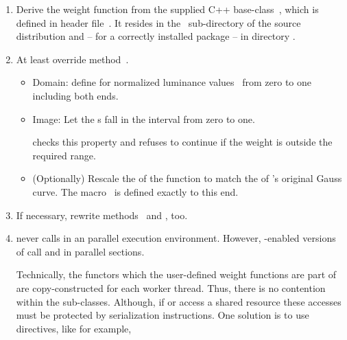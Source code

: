\begin{enumerate}
\item
  \begin{sloppypar}
    Derive the weight function from the supplied C++
    base-class~, which is defined in header
    file~.  It resides in the
    ~sub-directory of the source distribution and -- for
    a correctly installed package -- in directory
    .
  \end{sloppypar}

\item
  At least override method~.

  \begin{itemize}
  \item
    Domain: define  for normalized luminance
    values~ from zero to one including both ends.

  \item
    Image: Let the s fall in the interval from zero to
    one.

    \App{} checks this property and refuses to continue if the weight
    is outside the required range.

  \item
    (Optionally) Rescale the  of the function to match
    the  of \App{}'s original Gauss curve.  The
    macro~ is defined exactly to this end.
  \end{itemize}

\item
  If necessary, rewrite methods~ and
  , too.

\item
  \App{} never calls  in an  parallel
  execution environment.  However, -enabled versions
  of \App{} call  and  in parallel
  sections.

  Technically, the functors which the user-defined weight functions are
  part of are copy-constructed for each  worker thread.
  Thus, there is no contention within the 
  sub-classes.  Although, if  or  access a
  shared resource these accesses must be protected by serialization
  instructions.  One solution is to use  directives,
  like for example,


\end{enumerate}
